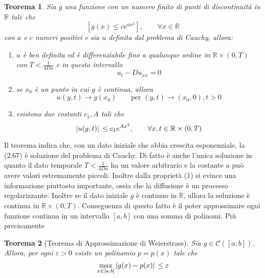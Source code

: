 \documentclass[a4paper,12pt, draft]{article}
\theoremstyle{break}
\newtheorem{theorem}{Teorema}[section]
\let\epsilon\varepsilon
\numberwithin{equation}{section}
\begin{document}
\begin{theorem}
  Sia \(g\) una funzione con un numero finito di punti di discontinuità in \(\mathbb{R}\) tale che 
  \[
    [g(x) \leq ce^{ax^2}], \qquad \forall x \in \mathbb{R}
  \]
  con \(a\) e \(c\) numeri positivi e sia \(u\) definita dal problema di Cauchy, allora:
  \begin{enumerate}
    \item \(u\) è ben definita ed è differenziabile fino a qualunque ordine in \(\mathbb{R} \times (0, T)\) con \(T < \frac{1}{4Da}\) e in questo intervallo 
    \[
    u_t - Du_{xx} = 0  
    \]
    \item se \(x_0\) è un punto in cui \(g\) è continua, allora
    \[
     u(y,t) \to g(x_0) \qquad \mbox{per }(y,t) \to (x_0,0), t>0 
    \]
    \item esistono due costanti \(c_1, A\) tali che 
    \[
      \abs*{u(y,t)} \leq c_1e^{Ax^2}, \qquad \forall x,t \in \mathbb{R} \times (0, T)
    \]
  \end{enumerate}
\end{theorem}
Il teorema indica che, con un dato iniziale che abbia crescita esponenziale, la (2.67) è soluzione del problema di Cauchy. Di fatto è anche l'unica soluzione in quanto il dato temporale \(T < \frac{1}{4Da}\) ha un valore arbitrario e la costante \(a\) può avere valori estremamente piccoli.
Inoltre dalla proprietà (1) si evince una informazione piuttosto importante, ossia che la diffusione è un processo regolarizzante.
Inoltre se il dato iniziale \(g\) è continuo in \(\mathbb{R}\), allora la soluzione è continua in \(\mathbb{R} \times (0,T)\). Conseguenza di questo fatto è il poter approssimare ogni funzione continua in un intervallo \([a,b]\) con una somma di polinomi.
Più precisamente
\begin{theorem}[Teorema di Approssimazione di Weierstrass]
  Sia \(g \in \mathcal{C}([a,b])\). Allora, per ogni \(\epsilon > 0\) esiste un polinomio \(p = p(x)\) tale che 
  \begin{equation}
    \max_{x\in [a,b]} \abs*{g(x)-p(x)} \leq \epsilon
  \end{equation}
\end{theorem}
\end{document}
